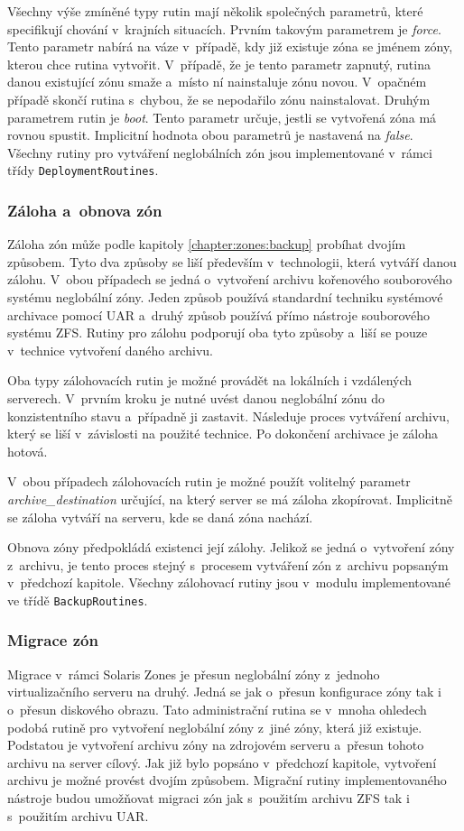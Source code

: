 Všechny výše zmíněné typy rutin mají několik společných parametrů, které specifikují chování v~krajních situacích. Prvním
takovým parametrem je \textit{force}. Tento parametr nabírá na váze v~případě, kdy již existuje zóna se jménem zóny, kterou
chce rutina vytvořit. V~případě, že je tento parametr zapnutý, rutina danou existující zónu smaže a~místo ní nainstaluje
zónu novou. V~opačném případě skončí rutina s~chybou, že se nepodařilo zónu nainstalovat. Druhým parametrem rutin je \textit{boot}.
Tento parametr určuje, jestli se vytvořená zóna má rovnou spustit. Implicitní hodnota obou parametrů je nastavená na \textit{false}.
Všechny rutiny pro vytváření neglobálních zón jsou implementované v~rámci třídy \verb|DeploymentRoutines|.
\subsubsection{Záloha a~obnova zón}
\label{chapter:implementation:szones:routines:backup}
Záloha zón může podle kapitoly \ref{chapter:zones:backup} probíhat dvojím způsobem. Tyto dva způsoby se liší především v~technologii,
která vytváří danou zálohu. V~obou případech se jedná o~vytvoření archivu kořenového souborového systému neglobální zóny. Jeden
způsob používá standardní techniku systémové archivace pomocí UAR a~druhý způsob používá přímo nástroje souborového
systému ZFS. Rutiny pro zálohu podporují oba tyto způsoby a~liší se pouze v~technice vytvoření daného archivu.

Oba typy zálohovacích rutin je možné provádět na lokálních i vzdálených serverech. V~prvním kroku je nutné uvést danou neglobální
zónu do konzistentního stavu a~případně ji zastavit. Následuje proces vytváření archivu, který se liší v~závislosti na
použité technice. Po dokončení archivace je záloha hotová. 

V~obou případech zálohovacích rutin je možné použít volitelný parametr \textit{archive\_destination} určující, na který server 
se má záloha zkopírovat. Implicitně se záloha vytváří na serveru, kde se daná zóna nachází.

Obnova zóny předpokládá existenci její zálohy. Jelikož se jedná o~vytvoření zóny z~archivu, je tento proces stejný
s~procesem vytváření zón z~archivu popsaným v~předchozí kapitole. Všechny zálohovací rutiny jsou v~modulu implementované ve třídě
\verb|BackupRoutines|.
\subsubsection{Migrace zón}
\label{chapter:implementation:szones:routines:migration}
Migrace v~rámci Solaris Zones je přesun neglobální zóny z~jednoho virtualizačního serveru na druhý. Jedná se jak o~přesun
konfigurace zóny tak i o~přesun diskového obrazu. Tato administrační rutina se v~mnoha ohledech podobá rutině pro vytvoření
neglobální zóny z~jiné zóny, která již existuje. Podstatou je vytvoření archivu zóny na zdrojovém serveru a~přesun tohoto archivu
na server cílový. Jak již bylo popsáno v~předchozí kapitole, vytvoření archivu je možné provést dvojím způsobem. Migrační rutiny
implementovaného nástroje budou umožňovat migraci zón jak s~použitím archivu ZFS tak i s~použitím archivu UAR.

